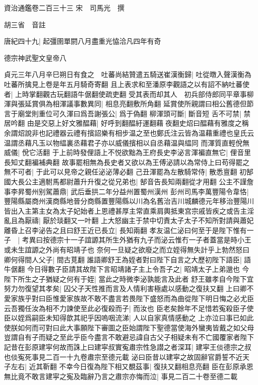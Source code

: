 資治通鑑卷二百三十三
宋　司馬光　撰

胡三省　音註

唐紀四十九|{
	起彊圉單閼八月盡重光恊洽凡四年有奇}


德宗神武聖文皇帝八

貞元三年八月辛巳朔日有食之　吐蕃尚結贊遣五騎送崔漢衡歸|{
	吐從暾入聲漢衡為吐蕃所擒見上卷是年五月騎奇寄翻}
且上表求和至潘原李觀語之以有詔不納吐蕃使者|{
	上時掌翻觀古玩翻語牛倨翻使疏吏翻}
受其表而却其人　初兵部侍郎同平章事柳渾與張延賞俱為相渾議事數異同|{
	相息亮翻敷所角翻}
延賞使所親謂曰相公舊德但節言于廟堂則重位可久渾曰爲吾謝張公|{
	爲于偽翻}
柳渾頭可斷|{
	斷音短}
舌不可禁|{
	禁居吟翻}
由是交惡上好文雅醖藉|{
	好呼到翻醖紆運翻藉夜翻史炤曰醖藉有雅度之稱余謂炤說非也記禮器云禮有擯詔樂有相步温之至也鄭氏注云皆為温藉重禮也皇氏云温謂丞藉凡玉以物緼裏丞藉君子亦以威儀擯相以自丞藉温與緼同}
而渾質直輕侻無威儀|{
	侻它活翻}
于上前時發俚語上不悦欲黜為王府長史李泌言渾褊直無它|{
	俚音里長知丈翻褊補典翻}
故事罷相無為長史者又欲以為王傅泌請以為常侍上曰苟得罷之無不可者|{
	于此可以見帝之親任泌泌薄必翻}
己丑渾罷為左散騎常侍|{
	散悉亶翻}
初郜國大長公主適駙馬都尉蕭升升復之從兄弟也|{
	郜音告長知兩翻從才用翻}
公主不謹詹事李昇蜀州别駕蕭鼎|{
	武后垂拱二年分益州置蜀州漢州}
彭州司馬李萬豐陽令韋恪|{
	豐陽縣屬商州漢商縣地晉分商縣置豐陽縣以川為名舊治吉川城麟德元年移治豐陽川}
皆出入主第主女為太子妃始者上恩禮甚厚主常直乘肩輿抵東宫宗戚皆疾之或告主淫亂且為厭禱|{
	厭於琰翻又一叶翻}
上大怒幽主于禁中切責太子太子不知所對請與蕭妃離昏上召李泌告之且曰舒王近已長立|{
	長知兩翻}
孝友温仁泌曰何至于是陛下惟有一子　|{
	考異曰按德宗十一子誼謜其所生外猶有九子而泌云惟冇一子者蓋當是時小王或未生誼謜之外尚有昭靖子也}
奈何一旦疑之欲廢之而立姪得無失計乎上勃然怒曰卿何得間人父子|{
	間古莧翻}
誰語卿舒王為姪者對曰陛下自言之大歷初陛下語臣|{
	語牛倨翻}
今日得數子臣請其故陛下言昭靖諸子主上令吾子之|{
	昭靖太子上弟邈也}
今陛下所生之子猶疑之何有于姪|{
	當此之時微李泌孰能言及此者}
舒王雖孝自今陛下宜努力勿復望其孝矣|{
	囚父子天性推而言及人情利害極處以感動之復扶又翻}
上曰卿不愛家族乎對曰臣惟愛家族故不敢不盡言若畏陛下盛怒而為曲從陛下明日悔之必尤臣云吾獨任汝為相不力諫使至此必復殺而子|{
	而汝也}
臣老矣餘年不足惜若寃殺臣子使臣以姪爲嗣臣未知得歆其祀乎因嗚咽流涕|{
	人以自家真情感動之}
上亦泣曰事已如此使朕如何而可對曰此大事願陛下審圖之臣始謂陛下聖德當使海外蠻夷皆戴之如父母豈謂自有子而疑之至此乎臣今盡言不敢避忌諱自古父子相疑未有不亡國覆家者陛下記昔在彭原建寜何故而誅上曰建寜叔實寃肅宗性急譛之者深耳|{
	建寜王倓德宗之叔也倓寃死事見二百一十九卷肅宗至德元載}
泌曰臣昔以建寜之故固辭官爵誓不近天子左右|{
	近其靳翻}
不幸今日復為陛下相又覩茲事|{
	復扶又翻相息亮翻}
臣在彭原承恩無比竟不敢言建寜之寃及臨辭乃言之肅宗亦悔而泣|{
	事見二百二十卷至德二載}
